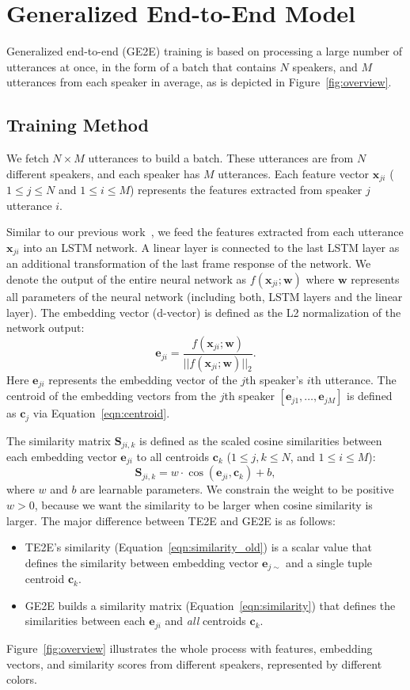\documentclass{article}
\newcommand{\vx}{\mathbf{x}}
\newcommand{\ve}{\mathbf{e}}
\newcommand{\vc}{\mathbf{c}}
\newcommand{\vw}{\mathbf{w}}
\newcommand{\ms}{\mathbf{S}}
\begin{document}
\section{Generalized End-to-End Model}
\label{sec:methods}
Generalized end-to-end (GE2E) training is based on processing a large number of
utterances at once, in the form of a batch that contains $N$ speakers,
and $M$ utterances from each speaker in average, as is depicted in Figure~\ref{fig:overview}.

\subsection{Training Method}
\label{sec:ge2e}
We fetch $N\times M$ utterances to build a batch.
These utterances are from $N$ different speakers, and each speaker has $M$ utterances.
Each feature vector $\vx_{ji}$ ($1 \leq j \leq N$ and $1 \leq i \leq M$)
represents the features extracted from speaker $j$ utterance $i$.

Similar to our previous work~\cite{heigold2016end}, we feed the features extracted from each utterance $\vx_{ji}$
into an LSTM network.
A linear layer is connected to the last LSTM layer as an additional
transformation of the last frame response of the network. We denote the
output of the entire neural network as $f(\vx_{ji};\vw)$ where
$\vw$ represents all parameters of the neural network (including both, LSTM layers and
the linear layer). The embedding vector (d-vector) is defined as the L2
normalization of the network output:
\begin{equation}
\label{eqn:lstm}
  \ve_{ji}=\frac{f(\vx_{ji};\vw)}{||f(\vx_{ji};\vw)||_2}.
\end{equation}
Here $\ve_{ji}$ represents the embedding vector of the $j$th speaker's $i$th
utterance. The centroid of the embedding vectors from the $j$th speaker
$[\ve_{j1},\dots, \ve_{jM}]$ is defined as $\vc_{j}$ via Equation~\ref{eqn:centroid}.


The similarity matrix $\ms_{ji,k}$ is defined as the scaled cosine similarities
between each embedding vector $\ve_{ji}$ to all centroids
$\vc_{k}$ ($1\leq j,k\leq N$, and $1\leq i\leq M$):
\begin{equation}
\label{eqn:similarity}
  \ms_{ji,k}=w\cdot \cos(\ve_{ji},\vc_k) + b ,
\end{equation}
where $w$ and $b$ are learnable parameters.
We constrain the weight to be positive $w>0$, because
we want the similarity to be larger when cosine similarity is larger.
The major difference between TE2E and GE2E is as follows:
\begin{itemize}
  \item TE2E's similarity (Equation~\ref{eqn:similarity_old}) is a scalar value
    that defines the similarity between embedding vector $\ve_{j\sim}$ and a single tuple centroid $\vc_k$.
  \item GE2E builds a similarity matrix (Equation~\ref{eqn:similarity}) that
    defines the similarities between each $\ve_{ji}$ and \textit{all} centroids $\vc_k$.
\end{itemize}
Figure~\ref{fig:overview} illustrates the whole process with features, embedding vectors, and
similarity scores from different speakers, represented by different colors.
\end{document}
